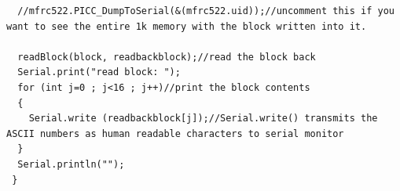 \documentclass[a4paper, 11pt]{article}           %
\begin{document}
\begin{lstlisting}
  //mfrc522.PICC_DumpToSerial(&(mfrc522.uid));//uncomment this if you want to see the entire 1k memory with the block written into it.

  readBlock(block, readbackblock);//read the block back
  Serial.print("read block: ");
  for (int j=0 ; j<16 ; j++)//print the block contents
  {
    Serial.write (readbackblock[j]);//Serial.write() transmits the ASCII numbers as human readable characters to serial monitor
  }
  Serial.println("");
 }

\end{lstlisting}

\end{document}
